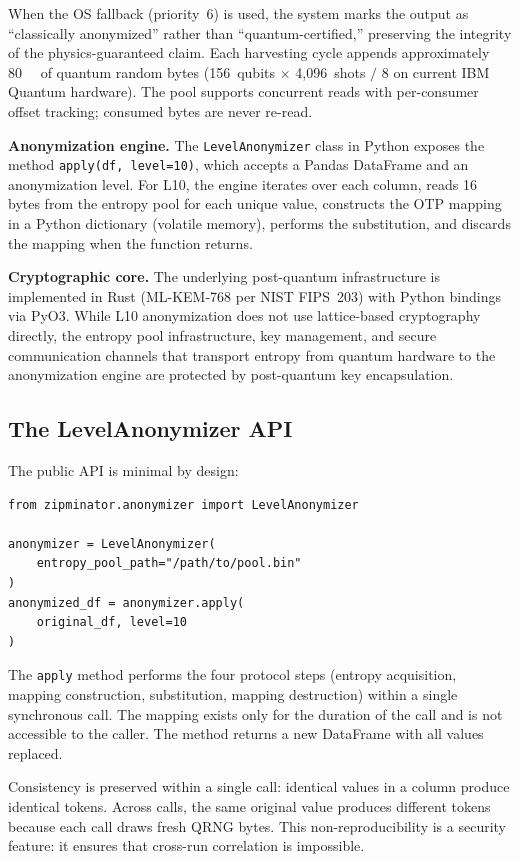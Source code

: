 \documentclass[journal]{IEEEtran}
\begin{document}
When the OS fallback (priority~6) is used, the system marks the output as ``classically anonymized'' rather than ``quantum-certified,'' preserving the integrity of the physics-guaranteed claim. Each harvesting cycle appends approximately \SI{80}{\kilo\byte} of quantum random bytes (156~qubits $\times$ 4{,}096~shots $/$ 8 on current IBM Quantum hardware). The pool supports concurrent reads with per-consumer offset tracking; consumed bytes are never re-read.

\textbf{Anonymization engine.} The \texttt{LevelAnonymizer} class in Python exposes the method \texttt{apply(df, level=10)}, which accepts a Pandas DataFrame and an anonymization level. For L10, the engine iterates over each column, reads 16 bytes from the entropy pool for each unique value, constructs the OTP mapping in a Python dictionary (volatile memory), performs the substitution, and discards the mapping when the function returns.

\textbf{Cryptographic core.} The underlying post-quantum infrastructure is implemented in Rust (ML-KEM-768 per NIST FIPS~203) with Python bindings via PyO3. While L10 anonymization does not use lattice-based cryptography directly, the entropy pool infrastructure, key management, and secure communication channels that transport entropy from quantum hardware to the anonymization engine are protected by post-quantum key encapsulation.

\subsection{The LevelAnonymizer API}
\label{subsec:api}

The public API is minimal by design:

{\footnotesize\begin{verbatim}
from zipminator.anonymizer import LevelAnonymizer

anonymizer = LevelAnonymizer(
    entropy_pool_path="/path/to/pool.bin"
)
anonymized_df = anonymizer.apply(
    original_df, level=10
)
\end{verbatim}}

The \texttt{apply} method performs the four protocol steps (entropy acquisition, mapping construction, substitution, mapping destruction) within a single synchronous call. The mapping exists only for the duration of the call and is not accessible to the caller. The method returns a new DataFrame with all values replaced.

Consistency is preserved within a single call: identical values in a column produce identical tokens. Across calls, the same original value produces different tokens because each call draws fresh QRNG bytes. This non-reproducibility is a security feature: it ensures that cross-run correlation is impossible.
\end{document}
